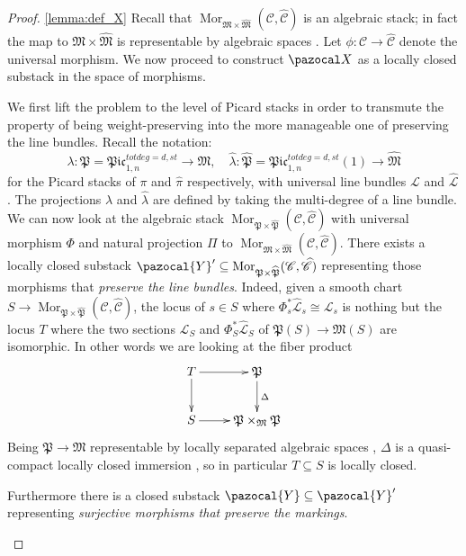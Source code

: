 \documentclass[11pt]{amsart}
\renewcommand{\to}{\rightarrow}
\newcommand{\X}{\pazocal X}
\renewcommand{\L}{\mathcal L}
\newcommand{\hL}{\widehat{\mathcal L}}
\newcommand{\cC}{\mathcal C}
\newcommand{\hC}{\widehat{\mathcal C}}
\newcommand{\MM}{\mathfrak M}
\newcommand{\hP}{\widehat{\mathfrak P}}
\newcommand{\hM}{\widehat{\mathfrak M}}
\newcommand{\PtoM}{\lambda}
\theoremstyle{plain}
\theoremstyle{definition}
\begin{document}
\begin{proof}\ref{lemma:def_X}
Recall that $\operatorname{Mor}_{\MM\times\hM}(\cC,\hC)$ is an algebraic stack; in fact the map to $\MM\times\hM$ is representable by algebraic spaces \cite{OlssonHOM}. Let $\phi\colon\cC\to\hC$ denote the universal morphism. We now proceed to construct $\X$ as a locally closed substack in the space of morphisms.

\begin{description}[labelindent=0cm,leftmargin=\parindent]

\item[Step 1] We first lift the problem to the level of Picard stacks in order to transmute the property of being weight-preserving into the more manageable one of preserving the line bundles. Recall the notation:
 \[\PtoM\colon\mathfrak P=\mathfrak{Pic}^{tot deg=d,st}_{1,n}\to\MM,\quad \hat\PtoM\colon\hP=\mathfrak{Pic}^{tot deg=d,st}_{1,n}(1)\to\hM\]
  for the Picard stacks of $\pi$ and $\hat \pi$ respectively, with universal line bundles $\L$ and $\hL$. The projections $\PtoM$ and $\hat \PtoM$ are defined by taking the multi-degree of a line bundle. We can now look at the algebraic stack $\operatorname{Mor}_{\mathfrak{P}\times\hP}(\cC,\hC)$ with universal morphism
 $\Phi$ and natural projection $\Pi$ to $\operatorname{Mor}_{\MM\times\hM}(\cC,\hC)$. There exists a locally closed substack $\pazocal{Y}'\subseteq \operatorname{Mor}_{\mathfrak{P}\times\hP}(\cC,\hC)$ representing those morphisms that \emph{preserve the line bundles}. Indeed, given a smooth chart $S\to\operatorname{Mor}_{\mathfrak{P}\times\hP}(\cC,\hC)$, the locus of $s\in S$ where $\Phi_s^*\hL_s\cong\mathcal{L}_s$ is nothing but the locus $T$ where the two sections $\mathcal{L}_S$ and $\Phi_S^*\hL_S$ of $\mathfrak{P}(S)\to\MM(S)$ are isomorphic. In other words we are looking at the fiber product 
  \[\xymatrix{T\ar[r]\ar[d]&\mathfrak{P}\ar[d]^{\Delta}\\
  S\ar[r]&\mathfrak{P}\times_{\MM}\mathfrak{P}}\]
Being $\mathfrak{P}\to\MM$ representable by locally separated algebraic spaces \cite[Theorem~8.3.1]{neron}, $\Delta$ is a quasi-compact locally closed immersion \cite[\href{http://stacks.math.columbia.edu/tag/04YU}{Tag 04YU}]{stacks-project}, so in particular $T\subseteq S$ is locally closed.

\item[Step 2] 
Furthermore there is a closed substack $\pazocal{Y}\subseteq \pazocal{Y}'$ representing \emph{surjective morphisms that preserve the markings}.


\end{description}
\end{proof}
\end{document}
